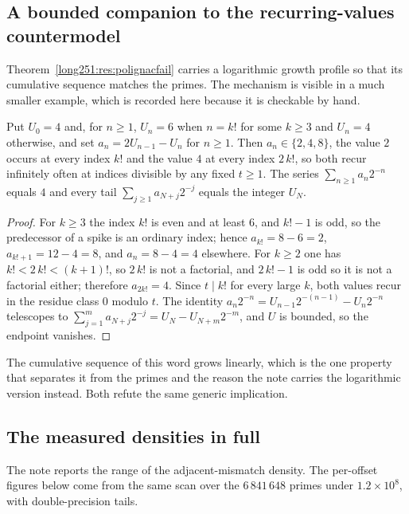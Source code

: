 \subsection{A bounded companion to the recurring-values countermodel}
\label{long251:sec:xr-boundedpolignac}

Theorem~\ref{long251:res:polignacfail} carries a logarithmic growth profile so that its
cumulative sequence matches the primes.  The mechanism is visible in a much
smaller example, which is recorded here because it is checkable by hand.

\begin{proposition}\label{long251:xr:boundedpolignac}
Put $U_0=4$ and, for $n\ge1$, $U_n=6$ when $n=k!$ for some $k\ge3$ and $U_n=4$
otherwise, and set $a_n=2U_{n-1}-U_n$ for $n\ge1$.  Then $a_n\in\{2,4,8\}$,
the value $2$ occurs at every index $k!$ and the value $4$ at every index
$2\,k!$, so both recur infinitely often at indices divisible by any fixed
$t\ge1$.  The series $\sum_{n\ge1}a_n2^{-n}$ equals $4$ and every tail
$\sum_{j\ge1}a_{N+j}2^{-j}$ equals the integer $U_N$.
\end{proposition}

\begin{proof}
For $k\ge3$ the index $k!$ is even and at least $6$, and $k!-1$ is odd, so the
predecessor of a spike is an ordinary index; hence $a_{k!}=8-6=2$,
$a_{k!+1}=12-4=8$, and $a_n=8-4=4$ elsewhere.  For $k\ge2$ one has
$k!<2\,k!<(k+1)!$, so $2\,k!$ is not a factorial, and $2\,k!-1$ is odd so it is
not a factorial either; therefore $a_{2k!}=4$.  Since $t\mid k!$ for every
large $k$, both values recur in the residue class $0$ modulo $t$.  The identity
$a_n2^{-n}=U_{n-1}2^{-(n-1)}-U_n2^{-n}$ telescopes to
$\sum_{j=1}^{m}a_{N+j}2^{-j}=U_N-U_{N+m}2^{-m}$, and $U$ is bounded, so the
endpoint vanishes.
\end{proof}

The cumulative sequence of this word grows linearly, which is the one property
that separates it from the primes and the reason the note carries the
logarithmic version instead.  Both refute the same generic implication.

\subsection{The measured densities in full}\label{long251:sec:xr-densities}

The note reports the range of the adjacent-mismatch density.  The per-offset
figures below come from the same scan over the $6\,841\,648$ primes under
$1.2\times10^{8}$, with double-precision tails.

